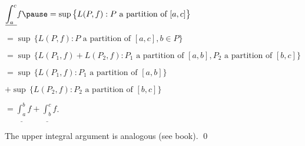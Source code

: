 \documentclass[10pt,aspectratio=149]{beamer}
\begin{document}
\begin{frame}

$\displaystyle
\underline{\int_a^c} f
\pause
=
\sup \, \bigl\{ L(P,f) : P \text{ a partition of } [a,c] \bigr\}
$

\pause
\medskip

\qquad
$\displaystyle
=
\sup \, \bigl\{ L(P,f) : P \text{ a partition of } [a,c], b \in P \bigr\}
$

\pause
\medskip

\qquad
$\displaystyle
=
\sup \, \bigl\{ L(P_1,f) + L(P_2,f) :
P_1 \text{ a partition of } [a,b], P_2 \text{ a partition of } [b,c] \bigr\}
$

\pause
\medskip

\qquad
$\displaystyle
=
\sup \, \bigl\{ L(P_1,f) : P_1 \text{ a partition of } [a,b] \bigr\}
$

\medskip

\qquad\qquad
$\displaystyle
+
\sup \, \bigl\{ L(P_2,f) : P_2 \text{ a partition of } [b,c] \bigr\}
$

\pause
\medskip

\qquad
$\displaystyle
=
\underline{\int_a^b} f + \underline{\int_b^c} f$.

\pause
\medskip

The upper integral argument is analogous (see book).
\qed

\end{frame}
\end{document}
